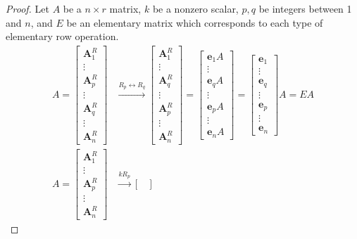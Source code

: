 \begin{proof}
	Let $A$ be a $n \times r$ matrix, $k$ be a nonzero scalar, $p, q$ be integers between 1 and $n$, and $E$ be an elementary matrix which corresponds to each type of elementary row operation.
	\begin{align*}
	A = \begin{bmatrix}
	\textbf{A}^R_1 \\ \vdots \\ \textbf{A}^R_p \\ \vdots \\ \textbf{A}^R_q \\ \vdots \\ \textbf{A}^R_n
	\end{bmatrix} &\xrightarrow{R_p \leftrightarrow R_q} \begin{bmatrix}
	\textbf{A}^R_1 \\ \vdots \\ \textbf{A}^R_q \\ \vdots \\ \textbf{A}^R_p \\ \vdots \\ \textbf{A}^R_n  
	\end{bmatrix} = \begin{bmatrix}
	\textbf{e}_1A \\ \vdots \\ \textbf{e}_qA \\ \vdots \\ \textbf{e}_pA \\ \vdots \\ \textbf{e}_nA
	\end{bmatrix} = \begin{bmatrix}
	\textbf{e}_1 \\ \vdots \\ \textbf{e}_q \\ \vdots \\ \textbf{e}_p \\ \vdots \\ \textbf{e}_n
	\end{bmatrix}A = EA \\
	A = \begin{bmatrix}
	\textbf{A}^R_1 \\ \vdots \\ \textbf{A}^R_p \\ \vdots \\ \textbf{A}^R_n
	\end{bmatrix} &\xrightarrow{kR_p} \begin{bmatrix}

\end{bmatrix}
\end{align*}
\end{proof}
